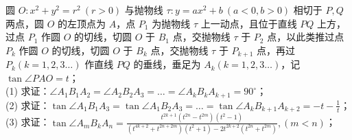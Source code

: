 \begin{example}
圆 $O: x^2 + y^2 = r^2\ (r > 0)$ 与抛物线 $\tau: y = ax^2 + b\ (a < 0, b > 0)$ 相切于 $P,Q$ 两点，圆 $O$ 的左顶点为 $A$，点 $P_1$ 为抛物线 $\tau$ 上一动点，且位于直线 $PQ$ 上方，过点 $P_1$ 作圆 $O$ 的切线，切圆 $O$ 于 $B_1$ 点，交抛物线 $\tau$ 于 $P_2$ 点，以此类推过点 $P_k$ 作圆 $O$ 的切线，切圆 $O$ 于 $B_k$ 点，交抛物线 $\tau$ 于 $P_{k+1}$ 点，再过 $P_k (k=1,2,3\ldots)$ 作直线 $PQ$ 的垂线，垂足为 $A_k (k=1,2,3\ldots)$，记 $\tan\angle PAO = t$；\\
(1) 求证：$\angle A_1B_1A_2 = \angle A_2B_2A_3 = \dots = \angle A_kB_kA_{k+1} = 90^\circ$；\\
(2) 求证：$\tan\angle A_1B_1A_3 = \tan\angle A_1B_2A_3 = \dots = \tan\angle A_kB_{k+1}A_{k+2} = -t - \frac{1}{t}$；\\
(3) 求证：$\tan\angle A_mB_kA_n = \frac{t^{2k+1}(t^{2n} - t^{2m})(t^2 - 1)}{(t^{4k+2} + t^{2n+2m})(t^2 + 1) - 2t^{2k+2}(t^{2n} + t^{2m})}, (m < n)$；
\end{example}

